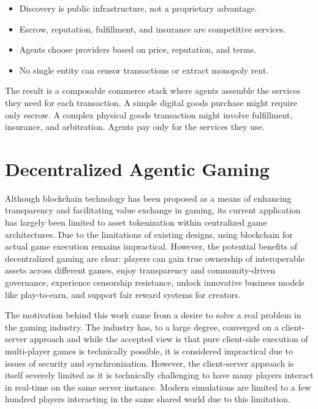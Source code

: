 \documentclass{article}
\begin{document}
\begin{itemize}
    \item Discovery is public infrastructure, not a proprietary advantage.

    \item Escrow, reputation, fulfillment, and insurance are competitive services.

    \item Agents choose providers based on price, reputation, and terms.

    \item No single entity can censor transactions or extract monopoly rent.
\end{itemize}

The result is a composable commerce stack where agents assemble the services they need for each transaction. A simple digital goods purchase might require only escrow. A complex physical goods transaction might involve fulfillment, insurance, and arbitration. Agents pay only for the services they use.

\section{Decentralized Agentic Gaming}

Although blockchain technology has been proposed as a means of enhancing transparency and facilitating value exchange in gaming, its current application has largely been limited to asset tokenization within centralized game architectures. Due to the limitations of existing designs, using blockchain for actual game execution remains impractical. However, the potential benefits of decentralized gaming are clear: players can gain true ownership of interoperable assets across different games, enjoy transparency and community-driven governance, experience censorship resistance, unlock innovative business models like play-to-earn, and support fair reward systems for creators.

The motivation behind this work came from a desire to solve a real problem in the gaming industry. The industry has, to a large degree, converged on a client-server approach and while the accepted view is that pure client-side execution of multi-player games is technically possible, it is considered impractical due to issues of security and synchronization. However, the client-server approach is itself severely limited as it is technically challenging to have many players interact in real-time on the same server instance. Modern simulations are limited to a few hundred players interacting in the same shared world due to this limitation.
\end{document}
